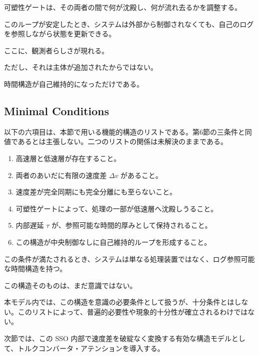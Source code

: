 可塑性ゲートは、その両者の間で何が沈殿し、何が流れ去るかを調整する。

このループが安定したとき、システムは外部から制御されなくても、自己のログを参照しながら状態を更新できる。

ここに、観測者らしさが現れる。

ただし、それは主体が追加されたからではない。

時間構造が自己維持的になっただけである。

\subsection{Minimal Conditions}

以下の六項目は、本節で用いる機能的構造のリストである。第6節の三条件と同値であるとは主張しない。二つのリストの関係は未解決のままである。

\begin{enumerate}
\item 高速層と低速層が存在すること。
\item 両者のあいだに有限の速度差 $\Delta v$ があること。
\item 速度差が完全同期にも完全分離にも至らないこと。
\item 可塑性ゲートによって、処理の一部が低速層へ沈殿しうること。
\item 内部遅延 $\tau$ が、参照可能な時間的厚みとして保持されること。
\item この構造が中央制御なしに自己維持的ループを形成すること。
\end{enumerate}

この条件が満たされるとき、システムは単なる処理装置ではなく、ログ参照可能な時間構造を持つ。

この構造そのものは、まだ意識ではない。

本モデル内では、この構造を意識の必要条件として扱うが、十分条件とはしない。このリストによって、普遍的必要性や現象的十分性が確立されるわけではない。

次節では、この SSO 内部で速度差を破綻なく変換する有効な構造モデルとして、トルクコンバータ・アテンションを導入する。
